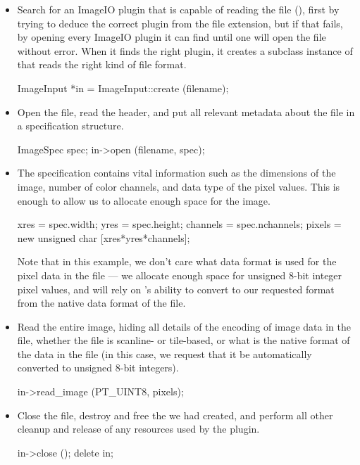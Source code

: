 \begin{itemize}
\item Search for an ImageIO plugin that is capable of reading the file
  (), first by trying to deduce the correct plugin from the
  file extension, but if that fails, by opening every ImageIO plugin it
  can find until one will open the file without error.  When it finds
  the right plugin, it creates a subclass instance of \ImageInput that
  reads the right kind of file format.
  \begin{code}
        ImageInput *in = ImageInput::create (filename);
  \end{code}
\item Open the file, read the header, and put all relevant metadata
  about the file in a specification structure.
  \begin{code}
        ImageSpec spec;
        in->open (filename, spec);
  \end{code}
\item The specification contains vital information such as the
  dimensions of the image, number of color channels, and data type of
  the pixel values.  This is enough to allow us to allocate enough space
  for the image.
  \begin{code}
        xres = spec.width;
        yres = spec.height;
        channels = spec.nchannels;
        pixels = new unsigned char [xres*yres*channels];
  \end{code}
  Note that in this example, we don't care what data format is used for
  the pixel data in the file --- we allocate enough space for unsigned
  8-bit integer pixel values, and will rely on \product's ability to
  convert to our requested format from the native data format of the
  file.
\item Read the entire image, hiding all details of the encoding of image
  data in the file, whether the file is scanline- or tile-based, or what
  is the native format of the data in the file (in this case, we request
  that it be automatically converted to unsigned 8-bit integers).
  \begin{code}
        in->read_image (PT_UINT8, pixels);
  \end{code}
\item Close the file, destroy and free the \ImageInput we had created,
  and perform all other cleanup and release of any resources used by
  the plugin.
  \begin{code}
        in->close ();
        delete in;
  \end{code}
\end{itemize}



